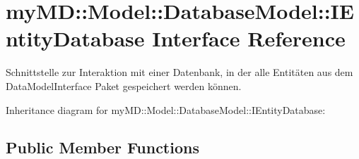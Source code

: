 \hypertarget{interfacemy_m_d_1_1_model_1_1_database_model_1_1_i_entity_database}{
\section{my\-MD::Model::Database\-Model::IEntity\-Database Interface Reference}
\label{d3/da9/interfacemy_m_d_1_1_model_1_1_database_model_1_1_i_entity_database}
}
Schnittstelle zur Interaktion mit einer Datenbank, in der alle Entit\"{a}ten aus dem Data\-Model\-Interface Paket gespeichert werden k\"{o}nnen.  


Inheritance diagram for my\-MD::Model::Database\-Model::IEntity\-Database:\subsection*{Public Member Functions}
